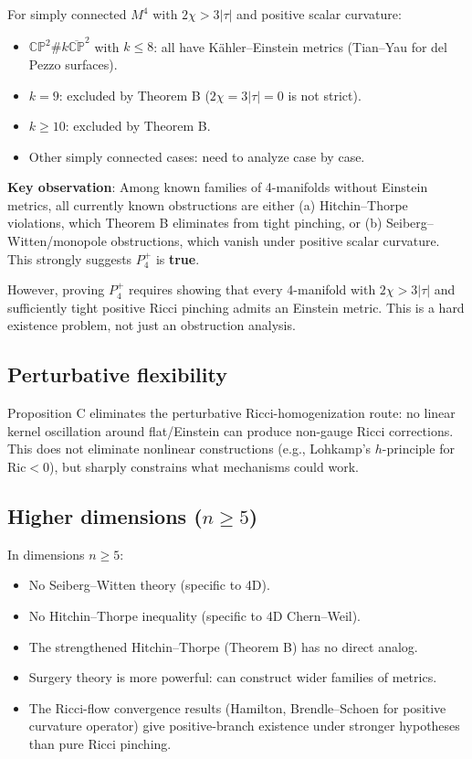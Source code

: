 For simply connected $M^4$ with $2\chi > 3|\tau|$ and positive scalar curvature:
\begin{itemize}
\item $\mathbb{CP}^2 \# k\overline{\mathbb{CP}}^2$ with $k \leq 8$: all have Kähler--Einstein metrics
      (Tian--Yau for del Pezzo surfaces).
\item $k = 9$: excluded by Theorem B ($2\chi = 3|\tau| = 0$ is not strict).
\item $k \geq 10$: excluded by Theorem B.
\item Other simply connected cases: need to analyze case by case.
\end{itemize}

\textbf{Key observation}: Among known families of 4-manifolds without Einstein metrics,
all currently known obstructions are either (a) Hitchin--Thorpe violations, which Theorem B 
eliminates from tight pinching, or (b) Seiberg--Witten/monopole obstructions, which vanish 
under positive scalar curvature. This strongly suggests $P_4^+$ is \textbf{true}.

However, proving $P_4^+$ requires showing that every 4-manifold with $2\chi > 3|\tau|$ and 
sufficiently tight positive Ricci pinching admits an Einstein metric. This is a hard existence
problem, not just an obstruction analysis.

\subsection{Perturbative flexibility}

Proposition C eliminates the perturbative Ricci-homogenization route:
no linear kernel oscillation around flat/Einstein can produce non-gauge Ricci corrections.
This does not eliminate nonlinear constructions (e.g., Lohkamp's $h$-principle for $\mathrm{Ric} < 0$),
but sharply constrains what mechanisms could work.

\subsection{Higher dimensions ($n \geq 5$)}

In dimensions $n \geq 5$:
\begin{itemize}
\item No Seiberg--Witten theory (specific to 4D).
\item No Hitchin--Thorpe inequality (specific to 4D Chern--Weil).
\item The strengthened Hitchin--Thorpe (Theorem B) has no direct analog.
\item Surgery theory is more powerful: can construct wider families of metrics.
\item The Ricci-flow convergence results (Hamilton, Brendle--Schoen for positive curvature operator)
      give positive-branch existence under stronger hypotheses than pure Ricci pinching.
\end{itemize}


